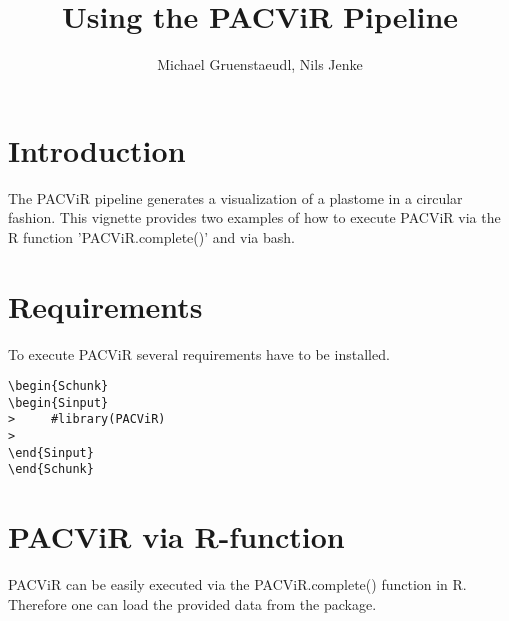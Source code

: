 \documentclass[letterpaper]{article}
\author{Michael Gruenstaeudl, Nils Jenke}
\title{Using the PACViR Pipeline}
\begin{document}



\maketitle

\tableofcontents

\section{Introduction}

  The PACViR pipeline generates a visualization of a plastome in a circular fashion. This vignette provides two examples of   how to execute PACViR via the R function 'PACViR.complete()' and via bash.

\section{Requirements}

  To execute PACViR several requirements have to be installed.


  \begin{footnotesize}
  \begin{lstlisting}[linerange=\\begin\{Sinput\}-\\end\{Sinput\},includerangemarker=false]
\begin{Schunk}
\begin{Sinput}
>     #library(PACViR)
> 
\end{Sinput}
\end{Schunk}
  \end{lstlisting}
  \end{footnotesize}


\section{PACViR via R-function }

  PACViR can be easily executed via the PACViR.complete() function in R. Therefore one can load the provided data from the package.
\end{document}
